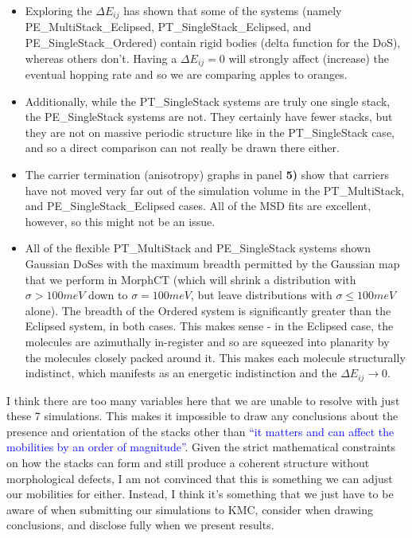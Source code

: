 \documentclass[12pt]{article}
\begin{document}
\begin{itemize}
    \item{Exploring the $\Delta E_{ij}$ has shown that some of the systems (namely PE\_MultiStack\_Eclipsed, PT\_SingleStack\_Eclipsed, and PE\_SingleStack\_Ordered) contain rigid bodies (delta function for the DoS), whereas others don't.
        Having a $\Delta E_{ij} = 0$ will strongly affect (increase) the eventual hopping rate and so we are comparing apples to oranges.}
    \item{Additionally, while the PT\_SingleStack systems are truly one single stack, the PE\_SingleStack systems are not.
        They certainly have fewer stacks, but they are not on massive periodic structure like in the PT\_SingleStack case, and so a direct comparison can not really be drawn there either.}
    \item{The carrier termination (anisotropy) graphs in panel \textbf{5)} show that carriers have not moved very far out of the simulation volume in the PT\_MultiStack, and PE\_SingleStack\_Eclipsed cases.
        All of the MSD fits are excellent, however, so this might not be an issue.}
    \item{All of the flexible PT\_MultiStack and PE\_SingleStack systems shown Gaussian DoSes with the maximum breadth permitted by the Gaussian map that we perform in MorphCT (which will shrink a distribution with $\sigma > 100 meV$ down to $\sigma = 100 meV$, but leave distributions with $\sigma \leq 100 meV$ alone).
        The breadth of the Ordered system is significantly greater than the Eclipsed system, in both cases.
    This makes sense - in the Eclipsed case, the molecules are azimuthally in-register and so are squeezed into planarity by the molecules closely packed around it.
This makes each molecule structurally indistinct, which manifests as an energetic indistinction and the $\Delta E_{ij} \rightarrow 0$.}
\end{itemize}


I think there are too many variables here that we are unable to resolve with just these 7 simulations.
This makes it impossible to draw any conclusions about the presence and orientation of the stacks other than \textcolor{blue}{``it matters and can affect the mobilities by an order of magnitude''}.
Given the strict mathematical constraints on how the stacks can form and still produce a coherent structure without morphological defects, I am not convinced that this is something we can adjust our mobilities for either.
Instead, I think it's something that we just have to be aware of when submitting our simulations to KMC, consider when drawing conclusions, and disclose fully when we present results.
\end{document}
